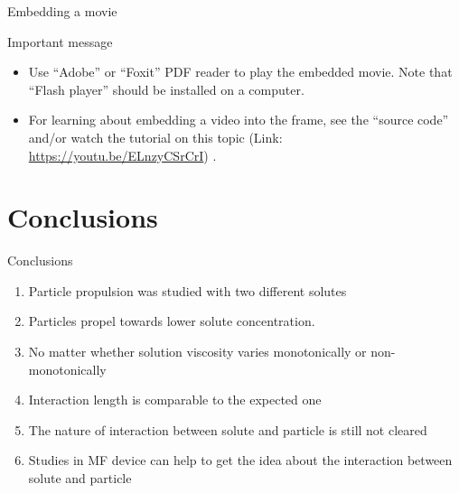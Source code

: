 \documentclass{beamer}
\begin{document}
\begin{frame}[c]{Embedding a movie}	
	\centering\scriptsize	
	\\
	\hfill\cite{Has18}
	
	\vfill 
	
	\begin{alertblock}{Important message}
		\begin{itemize} \scriptsize	
			\item Use ``Adobe'' or ``Foxit'' PDF reader to play the embedded movie. Note that ``Flash player'' should be installed on a computer.
			\item For learning about embedding a video into the frame, see the ``source code'' and/or watch the tutorial on this topic (Link: \href{https://youtu.be/ELnzyCSrCrI}{https://youtu.be/ELnzyCSrCrI}) .
		\end{itemize}	  
	\end{alertblock}
\end{frame}

\section{Conclusions}

\begin{frame}{Conclusions}
	\begin{block}{}
		\begin{enumerate}\setlength{\itemsep}{3mm}\scriptsize
			\item Particle propulsion was studied with two different solutes
			\item Particles propel towards lower solute concentration.
			\item No matter whether solution viscosity varies monotonically or non-monotonically
			\item Interaction length is comparable to the expected one
			\item The nature of interaction between solute and particle is still not cleared
			\item Studies in MF device can help to get the idea about the interaction between solute and particle
		\end{enumerate}
	\end{block}
\end{frame}
\end{document}
